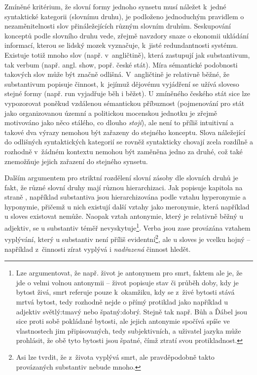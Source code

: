 \documentclass[a4paper, 11pt, oneside, showtrims]{book}
\newcommand{\itNameRef}[1]{\textit{\nameref{#1}}}
\newcommand\ex{\textsf}
\begin{document}
					Zmíněné kritérium, že slovní formy jednoho synsetu musí náležet k~jedné syntaktické kategorii (slovnímu druhu), je podloženo jednoduchým pravidlem o nezaměnitelnosti slov přináležejících různým slovním druhům. %
					Seskupování konceptů podle slovního druhu vede, zřejmě navzdory snaze o ekonomii ukládání informací, kterou se lidský mozek vyznačuje, k~jisté redundantnosti systému. Existuje totiž mnoho slov (např. v~angličtině), která zastupují jak substantivum, tak verbum (např. angl. \ex{show}, popř. české \ex{stát}). Míra sémantické podobnosti takových slov může být značně odlišná. V~angličtině je relativně běžné, že substantivum popisuje činnost, k~jejímuž dějovému vyjádření se užívá sloveso stejné formy (např. \ex{run} vyjadřuje \ex{běh} i \ex{běžet}). U zmíněného českého \ex{stát} sice lze vypozorovat poněkud vzdálenou sémantickou příbuznost (pojmenování pro stát jako organizovanou územní a politickou mocenskou jednotku \parencite{Dorling2003oxforddic} je zřejmě motivováno jako něco stálého, co dlouho \textit{stojí}), ale není to příliš intuitivní a takové dva výrazy nemohou být zařazeny do stejného konceptu. Slova náležející do odlišných syntaktických kategorií se rovněž syntakticky chovají zcela rozdílně a rozhodně v~žádném kontextu nemohou být zaměněna jedno za druhé, což také znemožňuje jejich zařazení do stejného synsetu. \parencite{miller1990introduction} 

					Dalším argumentem pro striktní rozdělení slovní zásoby dle slovních druhů je fakt, že různé slovní druhy mají různou hierarchizaci. Jak popisuje kapitola \itNameRef{cha:sem-vztahy} na straně \pageref{cha:sem-vztahy}, například substantiva jsou hierarchizována podle vztahu hyperonymie a hyponymie, přičemž u nich existují další vztahy jako meronymie, která například u sloves existovat nemůže. Naopak vztah antonymie, který je relativně běžný u adjektiv, se u substantiv téměř nevyskytuje\footnote{Lze argumentovat, že např. \ex{život} je antonymem pro \ex{smrt}, faktem ale je, že jde o velmi volnou antonymii -- život popisuje stav či průběh doby, kdy je bytost živá, smrt referuje pouze k~okamžiku, kdy se z~živé bytosti stává mrtvá bytost, tedy rozhodně nejde o přímý protiklad jako například u adjektiv \ex{světlý:tmavý} nebo \ex{špatný:dobrý}. Stejně tak např. \ex{Bůh} a \ex{Ďábel} jsou sice proti sobě pokládané bytosti, ale jejich antonymie spočívá spíše ve vlastnostech jim připisovaných, tedy subjektivních, a uživatel jazyka může prohlásit, že obě tyto bytosti jsou špatné, čímž ztratí svou protikladnost.}. Verba jsou zase provázána vztahem vyplývání, který u substantiv není příliš evidentní\footnote{Asi lze tvrdit, že z~\ex{života} vyplývá \ex{smrt}, ale pravděpodobně takto provázaných substantiv nebude mnoho.}, ale u sloves je vcelku hojný -- například z~činnosti \ex{zírat} vyplývá i \textit{nadřazená} činnost \ex{hledět}.
\end{document}
